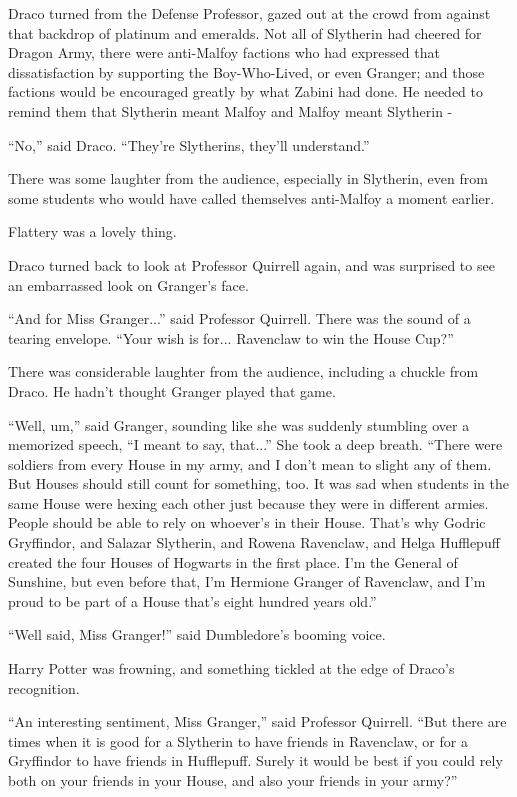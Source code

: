 Draco turned from the Defense Professor, gazed out at the crowd from against that backdrop of platinum and emeralds. Not all of Slytherin had cheered for Dragon Army, there were anti-Malfoy factions who had expressed that dissatisfaction by supporting the Boy-Who-Lived, or even Granger; and those factions would be encouraged greatly by what Zabini had done. He needed to remind them that Slytherin meant Malfoy and Malfoy meant Slytherin -

``No,'' said Draco. ``They're Slytherins, they'll understand.''

There was some laughter from the audience, especially in Slytherin, even from some students who would have called themselves anti-Malfoy a moment earlier.

Flattery was a lovely thing.

Draco turned back to look at Professor Quirrell again, and was surprised to see an embarrassed look on Granger's face.

``And for Miss Granger...'' said Professor Quirrell. There was the sound of a tearing envelope. ``Your wish is for... Ravenclaw to win the House Cup?''

There was considerable laughter from the audience, including a chuckle from Draco. He hadn't thought Granger played that game.

``Well, um,'' said Granger, sounding like she was suddenly stumbling over a memorized speech, ``I meant to say, that...'' She took a deep breath. ``There were soldiers from every House in my army, and I don't mean to slight any of them. But Houses should still count for something, too. It was sad when students in the same House were hexing each other just because they were in different armies. People should be able to rely on whoever's in their House. That's why Godric Gryffindor, and Salazar Slytherin, and Rowena Ravenclaw, and Helga Hufflepuff created the four Houses of Hogwarts in the first place. I'm the General of Sunshine, but even before that, I'm Hermione Granger of Ravenclaw, and I'm proud to be part of a House that's eight hundred years old.''

``Well said, Miss Granger!'' said Dumbledore's booming voice.

Harry Potter was frowning, and something tickled at the edge of Draco's recognition.

``An interesting sentiment, Miss Granger,'' said Professor Quirrell. ``But there are times when it is good for a Slytherin to have friends in Ravenclaw, or for a Gryffindor to have friends in Hufflepuff. Surely it would be best if you could rely both on your friends in your House, and also your friends in your army?''

